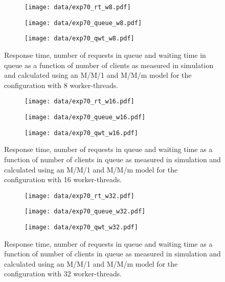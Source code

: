 \documentclass[report.tex]{subfiles}
\begin{document}
\begin{figure}
	\begin{subfigure}[b]{.33\linewidth}
		\centering
		\texttt{[image: data/exp70\_rt\_w8.pdf]}
	\end{subfigure}\hfill
	\begin{subfigure}[b]{.33\linewidth}
		\centering
		\texttt{[image: data/exp70\_queue\_w8.pdf]}
	\end{subfigure}\hfill
	\begin{subfigure}[b]{.33\linewidth}
		\centering
		\texttt{[image: data/exp70\_qwt\_w8.pdf]}
	\end{subfigure}
	\caption{Response time, number of requests in queue and waiting time in queue as a function of number of clients as measured in simulation and calculated using an M/M/1 and M/M/m model for the configuration with 8 worker-threads.}\label{exp70_w8}
\end{figure}

\begin{figure}
	\begin{subfigure}[b]{.33\linewidth}
		\centering
		\texttt{[image: data/exp70\_rt\_w16.pdf]}
	\end{subfigure}\hfill
	\begin{subfigure}[b]{.33\linewidth}
		\centering
		\texttt{[image: data/exp70\_queue\_w16.pdf]}
	\end{subfigure}\hfill
	\begin{subfigure}[b]{.33\linewidth}
		\centering
		\texttt{[image: data/exp70\_qwt\_w16.pdf]}
	\end{subfigure}
	\caption{Response time, number of requests in queue and waiting time as a function of number of clients in queue as measured in simulation and calculated using an M/M/1 and M/M/m model for the configuration with 16 worker-threads.}\label{exp70_w16}
\end{figure}

\begin{figure}
	\begin{subfigure}[b]{.33\linewidth}
		\centering
		\texttt{[image: data/exp70\_rt\_w32.pdf]}
	\end{subfigure}\hfill
	\begin{subfigure}[b]{.33\linewidth}
		\centering
		\texttt{[image: data/exp70\_queue\_w32.pdf]}
	\end{subfigure}\hfill
	\begin{subfigure}[b]{.33\linewidth}
		\centering
		\texttt{[image: data/exp70\_qwt\_w32.pdf]}
	\end{subfigure}
	\caption{Response time, number of requests in queue and waiting time as a function of number of clients in queue as measured in simulation and calculated using an M/M/1 and M/M/m model for the configuration with 32 worker-threads.}\label{exp70_w32}
\end{figure}
\end{document}
